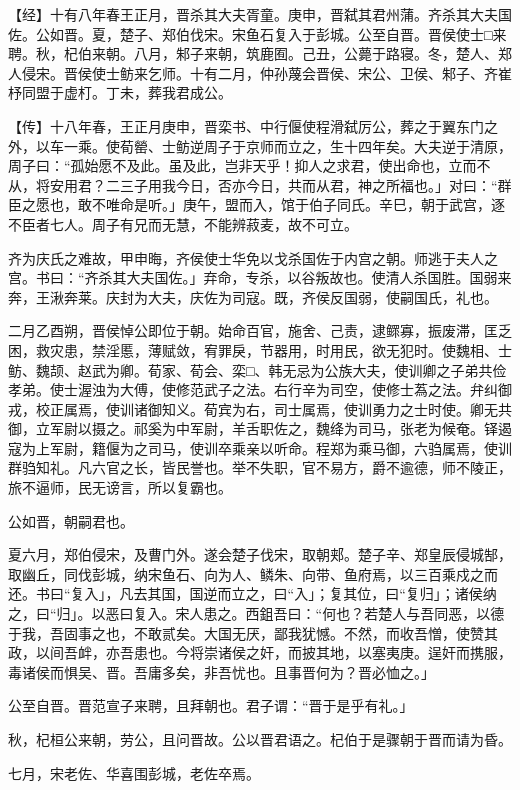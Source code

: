 \documentclass[]{article}
\begin{document}
【经】十有八年春王正月，晋杀其大夫胥童。庚申，晋弑其君州蒲。齐杀其大夫国佐。公如晋。夏，楚子、郑伯伐宋。宋鱼石复入于彭城。公至自晋。晋侯使士□来聘。秋，杞伯来朝。八月，邾子来朝，筑鹿囿。己丑，公薨于路寝。冬，楚人、郑人侵宋。晋侯使士鲂来乞师。十有二月，仲孙蔑会晋侯、宋公、卫侯、邾子、齐崔杼同盟于虚朾。丁未，葬我君成公。

【传】十八年春，王正月庚申，晋栾书、中行偃使程滑弑厉公，葬之于翼东门之外，以车一乘。使荀罃、士鲂逆周子于京师而立之，生十四年矣。大夫逆于清原，周子曰：``孤始愿不及此。虽及此，岂非天乎！抑人之求君，使出命也，立而不从，将安用君？二三子用我今日，否亦今日，共而从君，神之所福也。」对曰：``群臣之愿也，敢不唯命是听。」庚午，盟而入，馆于伯子同氏。辛巳，朝于武宫，逐不臣者七人。周子有兄而无慧，不能辨菽麦，故不可立。

齐为庆氏之难故，甲申晦，齐侯使士华免以戈杀国佐于内宫之朝。师逃于夫人之宫。书曰：``齐杀其大夫国佐。」弃命，专杀，以谷叛故也。使清人杀国胜。国弱来奔，王湫奔莱。庆封为大夫，庆佐为司寇。既，齐侯反国弱，使嗣国氏，礼也。

二月乙酉朔，晋侯悼公即位于朝。始命百官，施舍、己责，逮鳏寡，振废滞，匡乏困，救灾患，禁淫慝，薄赋敛，宥罪戾，节器用，时用民，欲无犯时。使魏相、士鲂、魏颉、赵武为卿。荀家、荀会、栾□、韩无忌为公族大夫，使训卿之子弟共俭孝弟。使士渥浊为大傅，使修范武子之法。右行辛为司空，使修士蒍之法。弁纠御戎，校正属焉，使训诸御知义。荀宾为右，司士属焉，使训勇力之士时使。卿无共御，立军尉以摄之。祁奚为中军尉，羊舌职佐之，魏绛为司马，张老为候奄。铎遏寇为上军尉，籍偃为之司马，使训卒乘亲以听命。程郑为乘马御，六驺属焉，使训群驺知礼。凡六官之长，皆民誉也。举不失职，官不易方，爵不逾德，师不陵正，旅不逼师，民无谤言，所以复霸也。

公如晋，朝嗣君也。

夏六月，郑伯侵宋，及曹门外。遂会楚子伐宋，取朝郏。楚子辛、郑皇辰侵城郜，取幽丘，同伐彭城，纳宋鱼石、向为人、鳞朱、向带、鱼府焉，以三百乘戍之而还。书曰``复入」，凡去其国，国逆而立之，曰``入」；复其位，曰``复归」；诸侯纳之，曰``归」。以恶曰复入。宋人患之。西鉏吾曰：``何也？若楚人与吾同恶，以德于我，吾固事之也，不敢贰矣。大国无厌，鄙我犹憾。不然，而收吾憎，使赞其政，以间吾衅，亦吾患也。今将崇诸侯之奸，而披其地，以塞夷庚。逞奸而携服，毒诸侯而惧吴、晋。吾庸多矣，非吾忧也。且事晋何为？晋必恤之。」

公至自晋。晋范宣子来聘，且拜朝也。君子谓：``晋于是乎有礼。」

秋，杞桓公来朝，劳公，且问晋故。公以晋君语之。杞伯于是骤朝于晋而请为昏。

七月，宋老佐、华喜围彭城，老佐卒焉。
\end{document}
